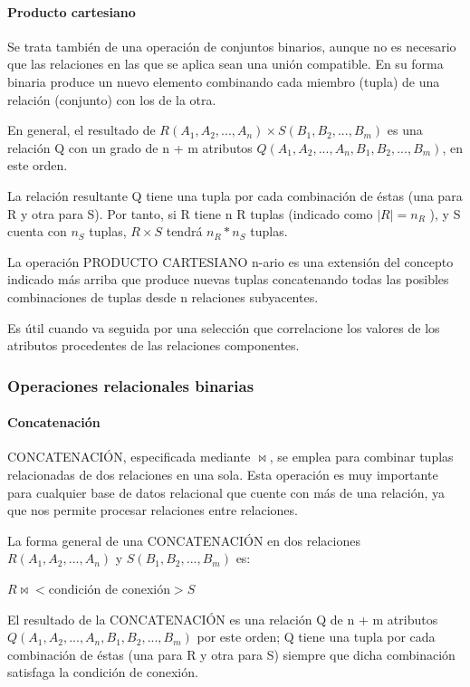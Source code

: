 \paragraph{Producto cartesiano}

Se trata también de una operación de conjuntos binarios, aunque no es necesario que las relaciones en las que se aplica sean una unión compatible. En su forma binaria produce un nuevo elemento combinando cada miembro (tupla) de una relación (conjunto) con los de la otra.


En general, el resultado de $R(A_1, A_2,...,A_n) \times S(B_1, B_2,..., B_m)$ es una relación Q con un grado de n + m atributos $Q(A_1, A_2,..., A_n, B_1, B_2,..., B_m)$, en este orden.


La relación resultante Q tiene una tupla por cada combinación de éstas (una para R y otra para S). Por tanto, si R tiene n R tuplas (indicado como $|R| = n_R$ ), y S cuenta con $n_S$ tuplas, $R \times S$ tendrá $n_R \ast	 n_S$ tuplas.


La operación PRODUCTO CARTESIANO n-ario es una extensión del concepto indicado más arriba que produce nuevas tuplas concatenando todas las posibles combinaciones de tuplas desde n relaciones subyacentes.


Es útil cuando va seguida por una selección que correlacione los valores de los atributos procedentes de las relaciones componentes.

\subsubsection{Operaciones relacionales binarias}
\paragraph{Concatenación}
CONCATENACIÓN, especificada mediante $\bowtie $, se emplea para combinar tuplas relacionadas de dos relaciones en una sola. Esta operación es muy importante para cualquier base de datos relacional que cuente con más de una relación, ya que nos permite procesar relaciones entre relaciones.


La forma general de una CONCATENACIÓN en dos relaciones $R(A_1, A_2,...,A_n)$ y $S(B_1, B_2,..., B_m)$ es:


$R\bowtie<$condición de conexión$> S$

El resultado de la CONCATENACIÓN es una relación Q de n + m atributos $Q(A_1, A_2,..., A_n, B_1, B_2,..., B_m)$ por este orden; Q tiene una tupla por cada combinación de éstas (una para R y otra para S) siempre que dicha combinación satisfaga la condición de conexión.


